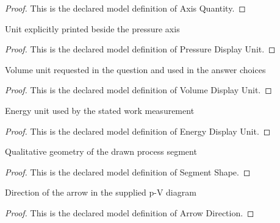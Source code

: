 \begin{proof}
  This is the declared model definition of Axis Quantity.
\end{proof}
\begin{definition}
  \label{def:physics:phyx-mini-0404:phyxminiproblems-problemphyxmini0404-pressuredisplayunit}
  Unit explicitly printed beside the pressure axis
\end{definition}
\begin{proof}
  This is the declared model definition of Pressure Display Unit.
\end{proof}
\begin{definition}
  \label{def:physics:phyx-mini-0404:phyxminiproblems-problemphyxmini0404-volumedisplayunit}
  Volume unit requested in the question and used in the answer choices
\end{definition}
\begin{proof}
  This is the declared model definition of Volume Display Unit.
\end{proof}
\begin{definition}
  \label{def:physics:phyx-mini-0404:phyxminiproblems-problemphyxmini0404-energydisplayunit}
  Energy unit used by the stated work measurement
\end{definition}
\begin{proof}
  This is the declared model definition of Energy Display Unit.
\end{proof}
\begin{definition}
  \label{def:physics:phyx-mini-0404:phyxminiproblems-problemphyxmini0404-segmentshape}
  Qualitative geometry of the drawn process segment
\end{definition}
\begin{proof}
  This is the declared model definition of Segment Shape.
\end{proof}
\begin{definition}
  \label{def:physics:phyx-mini-0404:phyxminiproblems-problemphyxmini0404-arrowdirection}
  Direction of the arrow in the supplied p-V diagram
\end{definition}
\begin{proof}
  This is the declared model definition of Arrow Direction.
\end{proof}
